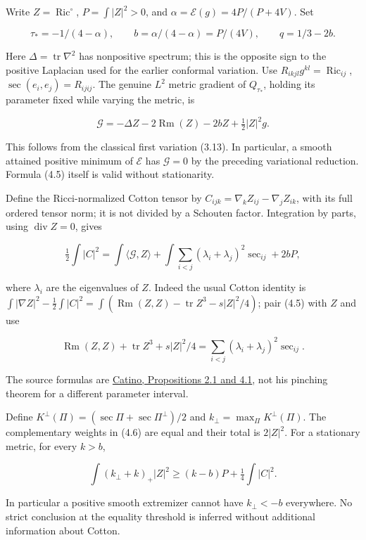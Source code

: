 \documentclass[
  10pt,
]{article}
\begin{document}
Write \(Z=\operatorname{Ric}^{\circ}\), \(P=\int|Z|^2>0\), and
\(\alpha=\mathcal E(g)=4P/(P+4V)\). Set

\[
 \tau_*=-1/(4-\alpha),\qquad
 b=\alpha/(4-\alpha)=P/(4V),\qquad q=1/3-2b.
\]

Here \(\Delta=\operatorname{tr}\nabla^2\) has nonpositive spectrum; this
is the opposite sign to the positive Laplacian used for the earlier
conformal variation. Use \(R_{ikjl}g^{kl}=\operatorname{Ric}_{ij}\),
\(\sec(e_i,e_j)=R_{ijij}\). The genuine \(L^2\) metric gradient of
\(Q_{\tau_*}\), holding its parameter fixed while varying the metric, is

\[
 \mathcal G=-\Delta Z-2\operatorname{Rm}(Z)-2bZ
                                      +\tfrac12|Z|^2g.          \tag{4.5}
\]

This follows from the classical first variation (3.13). In particular, a
smooth attained positive minimum of \(\mathcal E\) has \(\mathcal G=0\)
by the preceding variational reduction. Formula (4.5) itself is valid
without stationarity.

Define the Ricci-normalized Cotton tensor by
\(C_{ijk}=\nabla_kZ_{ij}-\nabla_jZ_{ik}\), with its full ordered tensor
norm; it is not divided by a Schouten factor. Integration by parts,
using \(\operatorname{div}Z=0\), gives

\[
 \tfrac12\int|C|^2
   =\int\langle\mathcal G,Z\rangle
     +\int\sum_{i<j}(\lambda_i+\lambda_j)^2\sec_{ij}+2bP,       \tag{4.6}
\]

where \(\lambda_i\) are the eigenvalues of \(Z\). Indeed the usual
Cotton identity is
\(\int|\nabla Z|^2-\tfrac12\int|C|^2 =\int(\operatorname{Rm}(Z,Z)-\operatorname{tr}Z^3-s|Z|^2/4)\);
pair (4.5) with \(Z\) and use

\[
 \operatorname{Rm}(Z,Z)+\operatorname{tr}Z^3+s|Z|^2/4
                  =\sum_{i<j}(\lambda_i+\lambda_j)^2\sec_{ij}.
\]

The source formulas are \href{https://arxiv.org/pdf/1404.0569}{Catino,
Propositions 2.1 and 4.1}, not his pinching theorem for a different
parameter interval.

Define \(K^\perp(\Pi)=(\sec\Pi+\sec\Pi^\perp)/2\) and
\(k_\perp=\max_\Pi K^\perp(\Pi)\). The complementary weights in (4.6)
are equal and their total is \(2|Z|^2\). For a stationary metric, for
every \(k>b\),

\[
 \int(k_\perp+k)_+|Z|^2
                  \ge(k-b)P+\tfrac14\int|C|^2.                 \tag{4.7}
\]

In particular a positive smooth extremizer cannot have \(k_\perp<-b\)
everywhere. No strict conclusion at the equality threshold is inferred
without additional information about Cotton.
\end{document}
